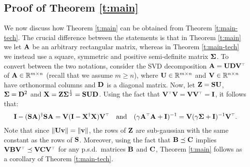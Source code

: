 \documentclass{article}
\begin{document}
\subsection{Proof of Theorem \ref{t:main}}\label{s:reduction}
We now discuss how Theorem \ref{t:main} can be obtained from Theorem
\ref{t:main-tech}. The crucial difference between the statements is
that in Theorem \ref{t:main} we let $\A$ be an arbitrary rectangular
matrix, whereas in Theorem \ref{t:main-tech} we instead use a square,
symmetric and positive semi-definite matrix $\Sigmab$. To convert between the
two notations, consider the SVD decomposition
$\A=\U\D\V^\top$ of $\A \in \R^{m \times n}$ (recall that we assume $m
\ge n$), where $\U\in\R^{m\times n}$ and $\V\in\R^{n\times 
  n}$ have orthonormal columns and $\D$ is a diagonal matrix. Now, let
$\Z = \S\U$, $\Sigmab=\D^2$ and  
$\X=\Z\Sigmab^{\frac12}=\S\U\D$. Using the fact that
$\V^\top\V=\V\V^\top=\I$, it follows that:
\begin{align*}
  \I - (\S\A)^\dagger\S\A = \V(\I-\X^\dagger\X)\V^\top\quad\text{and}\quad
  (\gamma\A^\top\A+\I)^{-1} = \V(\gamma\Sigmab + \I)^{-1}\V^\top.
\end{align*}
Note that since $\|\U\v\|=\|\v\|$, the rows of $\Z$ are
sub-gaussian with the same constant as the rows of $\S$. Moreover,
using the fact that $\B\preceq\C$ implies
$\V\B\V^\top\preceq\V\C\V^\top$ for any p.s.d.~matrices $\B$ and $\C$,
Theorem \ref{t:main} follows as a corollary of Theorem \ref{t:main-tech}.

\end{document}
